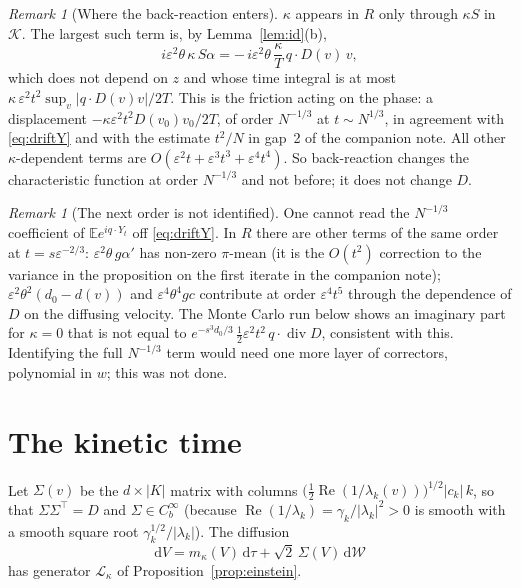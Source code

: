 \documentclass[11pt]{article}
\newcommand{\dd}{\mathrm{d}}
\newcommand{\E}{\mathbb{E}}
\newcommand{\eps}{\varepsilon}
\newcommand{\cL}{\mathcal{L}}
\newcommand{\cK}{\mathcal{K}}
\renewcommand{\Re}{\operatorname{Re}}
\newcommand{\Div}{\operatorname{div}}
\theoremstyle{remark}
\newtheorem{remark}[theorem]{Remark}
\begin{document}
\begin{remark}[Where the back-reaction enters]\label{rem:where}
$\kappa$ appears in $R$ only through $\kappa S$ in $\cK$. The largest such
term is, by Lemma~\ref{lem:id}(b),
\[
  i\eps^2\theta\,\kappa\,S\alpha=-\,i\eps^2\theta\,\frac{\kappa}{T}\,q\cdot D(v)\,v ,
\]
which does not depend on $z$ and whose time integral is at most
$\kappa\,\eps^2t^2\sup_v|q\cdot D(v)v|/2T$. This is the friction acting on
the phase: a displacement $-\kappa\eps^2t^2D(v_0)v_0/2T$, of order
$N^{-1/3}$ at $t\sim N^{1/3}$, in agreement with \eqref{eq:driftY} and with
the estimate $t^2/N$ in gap~2 of the companion note. All other
$\kappa$-dependent terms are $O(\eps^2t+\eps^3t^3+\eps^4t^4)$. So
back-reaction changes the characteristic function at order $N^{-1/3}$ and
not before; it does not change $D$.
\end{remark}

\begin{remark}[The next order is not identified]\label{rem:next}
One cannot read the $N^{-1/3}$ coefficient of $\E e^{iq\cdot Y_t}$ off
\eqref{eq:driftY}. In $R$ there are other terms of the same order at
$t=s\eps^{-2/3}$: $\eps^2\theta\,g\alpha'$ has non-zero $\pi$-mean (it is
the $O(t^2)$ correction to the variance in the proposition on the first
iterate in the companion note); $\eps^2\theta^2(d_0-d(v))$ and $\eps^4\theta^4gc$ contribute at order
$\eps^4t^5$ through the dependence of $D$ on the diffusing velocity. The
Monte Carlo run below shows an imaginary part for $\kappa=0$ that is not
equal to $e^{-s^3d_0/3}\,\tfrac12\eps^2t^2\,q\cdot\Div D$, consistent with
this. Identifying the full $N^{-1/3}$ term would need one more layer of
correctors, polynomial in $w$; this was not done.
\end{remark}

\section{The kinetic time}

Let $\Sigma(v)$ be the $d\times|K|$ matrix with columns
$\bigl(\tfrac12\Re(1/\lambda_k(v))\bigr)^{1/2}|c_k|\,k$, so that
$\Sigma\Sigma^{\!\top}=D$ and $\Sigma\in C_b^\infty$ (because
$\Re(1/\lambda_k)=\gamma_k/|\lambda_k|^2>0$ is smooth with a smooth square
root $\gamma_k^{1/2}/|\lambda_k|$). The diffusion
\begin{equation}
  \dd V=m_\kappa(V)\,\dd\tau+\sqrt2\,\Sigma(V)\,\dd\mathcal{W}
  \label{eq:FPsde}
\end{equation}
has generator $\cL_\kappa$ of Proposition~\ref{prop:einstein}.
\end{document}
